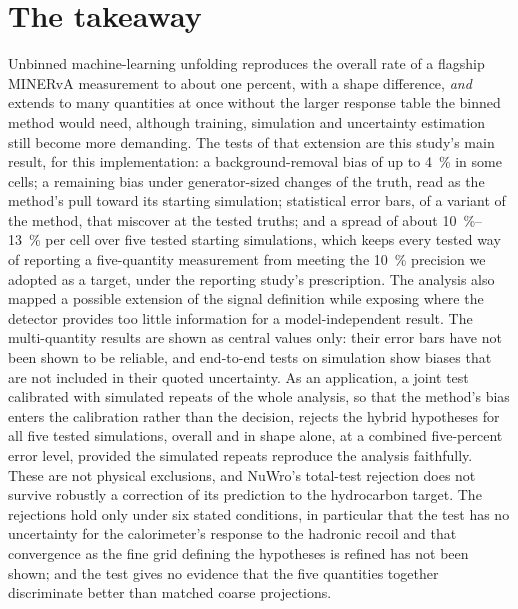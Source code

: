 \section{The takeaway}

Unbinned machine-learning unfolding reproduces the overall rate of a flagship MINERvA measurement to about one percent, with a shape difference, \emph{and} extends to many quantities at once without the larger response table the binned method would need, although training, simulation and uncertainty estimation still become more demanding. The tests of that extension are this study's main result, for this implementation: a background-removal bias of up to \SI{4}{\percent} in some cells; a remaining bias under generator-sized changes of the truth, read as the method's pull toward its starting simulation; statistical error bars, of a variant of the method, that miscover at the tested truths; and a spread of about \SIrange{10}{13}{\percent} per cell over five tested starting simulations, which keeps every tested way of reporting a five-quantity measurement from meeting the \SI{10}{\percent} precision we adopted as a target, under the reporting study's prescription. The analysis also mapped a possible extension of the signal definition while exposing where the detector provides too little information for a model-independent result. The multi-quantity results are shown as central values only: their error bars have not been shown to be reliable, and end-to-end tests on simulation show biases that are not included in their quoted uncertainty. As an application, a joint test calibrated with simulated repeats of the whole analysis, so that the method's bias enters the calibration rather than the decision, rejects the hybrid hypotheses for all five tested simulations, overall and in shape alone, at a combined five-percent error level, provided the simulated repeats reproduce the analysis faithfully. These are not physical exclusions, and NuWro's total-test rejection does not survive robustly a correction of its prediction to the hydrocarbon target. The rejections hold only under six stated conditions, in particular that the test has no uncertainty for the calorimeter's response to the hadronic recoil and that convergence as the fine grid defining the hypotheses is refined has not been shown; and the test gives no evidence that the five quantities together discriminate better than matched coarse projections.
